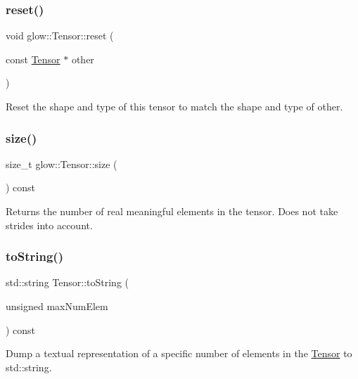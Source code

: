 \subsubsection{\texorpdfstring{reset()}{reset()}}
{\footnotesize\ttfamily void glow\+::\+Tensor\+::reset (\begin{DoxyParamCaption}\item[{const \hyperlink{classglow_1_1_tensor}{Tensor} $\ast$}]{other }\end{DoxyParamCaption})\hspace{0.3cm}{\ttfamily [inline]}}

Reset the shape and type of this tensor to match the shape and type of {\ttfamily other}. \mbox{\label{classglow_1_1_tensor_a131eef055527823adf306e8928d4ae04}} 
\subsubsection{\texorpdfstring{size()}{size()}}
{\footnotesize\ttfamily size\+\_\+t glow\+::\+Tensor\+::size (\begin{DoxyParamCaption}{ }\end{DoxyParamCaption}) const\hspace{0.3cm}{\ttfamily [inline]}}

\begin{DoxyReturn}{Returns}
the number of real meaningful elements in the tensor. Does not take strides into account. 
\end{DoxyReturn}
\mbox{\label{classglow_1_1_tensor_a306995cc2d51a2676bef62bca462e2c4}} 
\subsubsection{\texorpdfstring{to\+String()}{toString()}}
{\footnotesize\ttfamily std\+::string Tensor\+::to\+String (\begin{DoxyParamCaption}\item[{unsigned}]{max\+Num\+Elem }\end{DoxyParamCaption}) const}

Dump a textual representation of a specific number of elements in the \hyperlink{classglow_1_1_tensor}{Tensor} to std\+::string. \mbox{\label{classglow_1_1_tensor_a111b8eb06a33746bdd520931f940b520}} 
